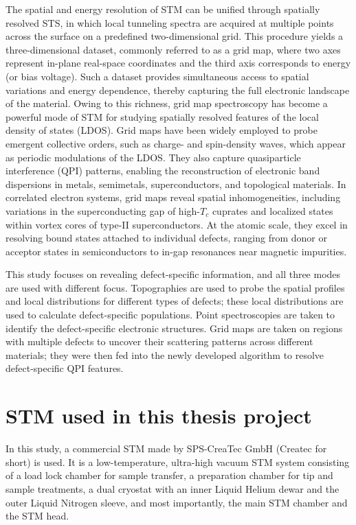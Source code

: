 The spatial and energy resolution of \ac{STM} can be unified through spatially resolved \ac{STS}, in which local tunneling spectra are acquired at multiple points across the surface on a predefined two-dimensional grid. This procedure yields a three-dimensional dataset, commonly referred to as a grid map, where two axes represent in-plane real-space coordinates and the third axis corresponds to energy (or bias voltage). Such a dataset provides simultaneous access to spatial variations and energy dependence, thereby capturing the full electronic landscape of the material. Owing to this richness, grid map spectroscopy has become a powerful mode of \ac{STM} for studying spatially resolved features of the local density of states (\ac{LDOS}). Grid maps have been widely employed to probe emergent collective orders, such as charge- and spin-density waves, which appear as periodic modulations of the \ac{LDOS}. They also capture quasiparticle interference (QPI) patterns, enabling the reconstruction of electronic band dispersions in metals, semimetals, superconductors, and topological materials\cite{avrahamQuasiparticleInterferenceStudies2018}. In correlated electron systems, grid maps reveal spatial inhomogeneities, including variations in the superconducting gap of high-$T_c$ cuprates\cite{duanSingleparticleTunnelingSpectroscopy2021, boyerImagingTwoGaps2007} and localized states within vortex cores of type-II superconductors\cite{panSTMStudiesElectronic2000, suderowImagingSuperconductingVortex2014}. At the atomic scale, they excel in resolving bound states attached to individual defects, ranging from donor or acceptor states in semiconductors\cite{mahieuDirectEvidenceShallow2005} to in-gap resonances near magnetic impurities\cite{schneiderMagnetismIngapStates2019, yangIngapQuasiparticleExcitations2013, chatzopoulosSpatiallyDispersingYuShibaRusinov2021}.

This study focuses on revealing defect-specific information, and all three modes are used with different focus. Topographies are used to probe the spatial profiles and local distributions for different types of defects; these local distributions are used to calculate defect-specific populations. Point spectroscopies are taken to identify the defect-specific electronic structures. Grid maps are taken on regions with multiple defects to uncover their scattering patterns across different materials; they were then fed into the newly developed algorithm to resolve defect-specific \ac{QPI} features. 

\section{STM used in this thesis project}
In this study, a commercial STM made by SPS-CreaTec GmbH (Createc for short) is used. It is a low-temperature, ultra-high vacuum STM system consisting of a load lock chamber for sample transfer, a preparation chamber for tip and sample treatments, a dual cryostat with an inner Liquid Helium dewar and the outer Liquid Nitrogen sleeve, and most importantly, the main STM chamber and the STM head. 

